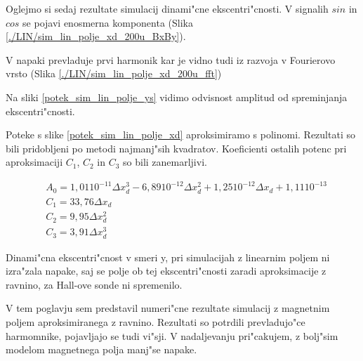 Oglejmo si sedaj rezultate simulacij dinami"cne ekscentri"cnosti. V signalih $sin$ in $cos$ se pojavi enosmerna komponenta (Slika \ref{./LIN/sim_lin_polje_xd_200u_BxBy}).


V napaki prevladuje prvi harmonik kar je vidno tudi iz razvoja v Fourierovo vrsto (Slika \ref{./LIN/sim_lin_polje_xd_200u_fft})




Na sliki \ref{potek_sim_lin_polje_ys} vidimo odvisnost amplitud od spreminjanja ekscentri"cnosti.


Poteke s slike \ref{potek_sim_lin_polje_xd} aproksimiramo  s polinomi.  Rezultati so bili pridobljeni po metodi najmanj"sih kvadratov. Koeficienti ostalih potenc pri aproksimaciji $C_1$, $C_2$ in $C_3$ so bili zanemarljivi. 

\begin{eqnarray}
&A_0=1,01 10^{-11} \Delta x_d^3 -6,89 10^{-12} \Delta x_d^2+1,25 10^{-12} \Delta x_d+1,11 10^{-13}\\
&C_1=33,76 \Delta x_d\\
&C_2=9,95 \Delta x_d^2\\
&C_3=3,91 \Delta x_d^3
\end{eqnarray}

Dinami"cna ekscentri"cnost v smeri y, pri simulacijah z linearnim poljem ni izra"zala napake, saj se polje ob tej ekscentri"cnosti zaradi aproksimacije z ravnino, za Hall-ove sonde ni spremenilo.

V tem poglavju sem predstavil numeri"cne rezultate simulacij z magnetnim poljem aproksimiranega z ravnino. Rezultati so potrdili prevladujo"ce harmomnike, pojavljajo se tudi vi"sji. V nadaljevanju pri"cakujem, z bolj"sim modelom magnetnega polja manj"se napake.


%
